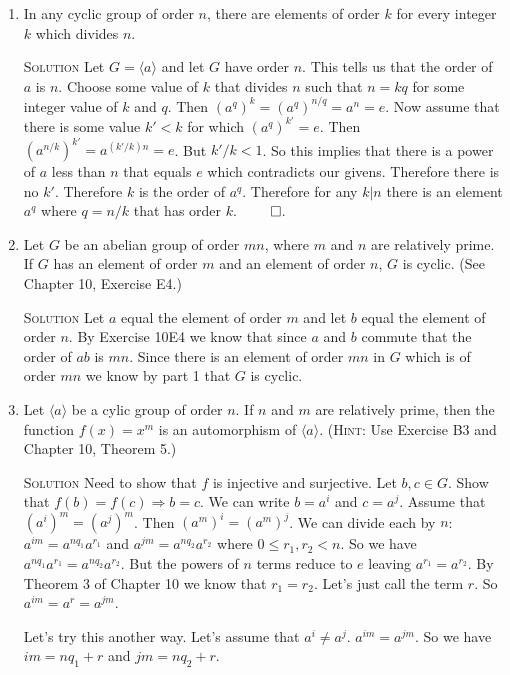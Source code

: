\documentclass[twoside]{amsart}
\newcommand{\solution}{\textsc{Solution}\xspace}
\newcommand{\blank}{\vspace{5pt}}
\newcommand{\itm}{\blank\item}
\newcommand{\sol}{\blank\noindent\solution}
\newcommand{\cgroup}[1]{\langle #1 \rangle}
\begin{document}
\begin{enumerate}[A.]
\begin{enumerate}[1)]
      \itm In any cyclic group of order $n$, there are elements of order $k$
      for every integer $k$ which divides $n$.

      \sol Let $G = \langle a \rangle$ and let $G$ have order $n$. 
      This tells us that the order of $a$ is $n$.
      Choose some value of $k$ that divides $n$ such that 
      $n = kq$ for some integer value of $k$ and $q$. Then
      $(a^q)^k = (a^q)^{n/q} = a^n = e$. Now assume that there
      is some value $k' < k$ for which $(a^q)^{k'} = e$. Then
      $(a^{n/k})^{k'} = a^{(k'/k)n} = e$. But $k'/k < 1$. So this implies
      that there is a power of $a$ less than $n$ that equals $e$ which
      contradicts our givens. Therefore there is no $k'$. Therefore
      $k$ is the order of $a^q$. Therefore for any $k | n$ there is
      an element $a^q$ where $q = n/k$ that has order $k$. $\qed$.

      \itm Let $G$ be an abelian group of order $mn$, where $m$ and $n$
      are relatively prime. If $G$ has an element of order $m$
      and an element of order $n$, $G$ is cyclic. (See Chapter 10,
      Exercise E4.)

      \sol Let $a$ equal the element of order $m$ and let $b$ equal the
      element of order $n$. By Exercise 10E4 we know that since $a$ and
      $b$ commute that the order of $ab$ is $mn$. Since there is an element
      of order $mn$ in $G$ which is of order $mn$ we know by part 1
      that $G$ is cyclic.

      \itm Let $\cgroup{ a }$ be a cylic group of order $n$. 
      If $n$ and $m$ are relatively prime, then the function $f(x) =
      x^m$ is an automorphism of $\cgroup{ a }$. (\textsc{Hint}: Use
      Exercise B3 and Chapter 10, Theorem 5.)

      \sol Need to show that $f$ is injective and surjective.
      Let $b,c \in G$. Show that $f(b) = f(c) \Rightarrow b = c$.
      We can write $b = a^i$ and $c = a^j$. Assume 
      that $(a^i)^m = (a^j)^m$.  Then $(a^m)^i = (a^m)^j$.
      We can divide each by $n$: 
      $a^{im} = a^{nq_1}a^{r_1}$ and $a^{jm} = a^{nq_2}a^{r_2}$ where
      $0 \le r_1, r_2 < n$. So we have 
      $a^{nq_1}a^{r_1} = a^{nq_2}a^{r_2}$. But the powers of $n$ terms
      reduce to $e$ leaving $a^{r_1}=a^{r_2}$. By Theorem 3 of Chapter 10
      we know that $r_1 = r_2$. Let's just call the term $r$.
      So $a^{im} = a^r = a^{jm}$.

      Let's try this another way. Let's assume that $a^i \ne a^j$.
      $a^{im} = a^{jm}$. So we have $im = nq_1+r$ and $jm = nq_2 + r$.




\end{enumerate}
\end{enumerate}
\end{document}
